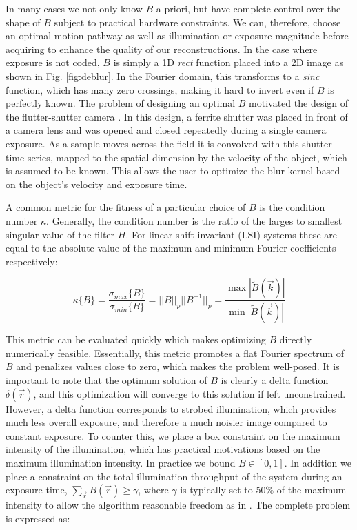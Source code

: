 In many cases we not only know $B$ a priori, but have complete control over the shape of $B$ subject to practical hardware constraints. We can, therefore, choose an optimal motion pathway as well as illumination or exposure magnitude before acquiring to enhance the quality of our reconstructions. In the case where exposure is not coded, $B$ is simply a 1D \textit{rect} function placed into a 2D image as shown in Fig. \ref{fig:deblur}. In the Fourier domain, this transforms to a \textit{sinc} function, which has many zero crossings, making it hard to invert even if $B$ is perfectly known. The problem of designing an optimal $B$ motivated the design of the flutter-shutter camera \cite{raskar2006coded}. In this design, a ferrite shutter was placed in front of a camera lens and was opened and closed repeatedly during a single camera exposure. As a sample moves across the field it is convolved with this shutter time series, mapped to the spatial dimension by the velocity of the object, which is assumed to be known. This allows the user to optimize the blur kernel based on the object's velocity and exposure time.

A common metric for the fitness of a particular choice of $B$ is the condition number $\kappa$.  Generally, the condition number is the ratio of the larges to smallest singular value of the filter $H$. For linear shift-invariant (LSI) systems these are equal to the absolute value of the maximum and minimum Fourier coefficients respectively:

\begin{equation}\label{condNum}
 \kappa\{B\} = \frac{\sigma_{max}\{B\}}{\sigma_{min}\{B\}} = ||B||_p || B^{-1}||_p = \frac{\max{|\tilde{B}(\vec{k})|}}{\min{|\tilde{B}(\vec{k})|}}
\end{equation}

This metric can be evaluated quickly which makes optimizing $B$ directly numerically feasible. Essentially, this metric promotes a flat Fourier spectrum of $B$ and penalizes values close to zero, which makes the problem well-posed. It is important to note that the optimum solution of $B$ is clearly a delta function $\delta(\vec{r})$, and this optimization will converge to this solution if left unconstrained. However, a delta function corresponds to strobed illumination, which provides much less overall exposure, and therefore a much noisier image compared to constant exposure. To counter this, we place a box constraint on the maximum intensity of the illumination, which has practical motivations based on the maximum illumination intensity. In practice we bound $B\in[0,1]$. In addition we place a constraint on the total illumination throughput of the system during an exposure time, $\sum_{\vec{r}} B(\vec{r})\geq \gamma$, where $\gamma$ is typically set to 50$\%$ of the maximum intensity to allow the algorithm reasonable freedom as in \cite{raskar2006coded}. The complete problem is expressed as:

